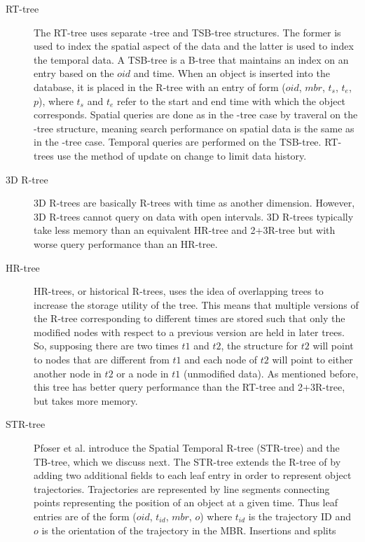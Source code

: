 \begin{description}
	\item[RT-tree] The RT-tree\cite{xu1990rt} uses separate \rbase-tree and 
	TSB-tree structures. The former is used 
	to index the spatial aspect of the data and the latter is used to index
	the temporal data. A TSB-tree is a B-tree that maintains an index on an 
	entry based on the $oid$ and time. When an object is inserted into the 
	database, it is placed in the R-tree with an entry of form 
	($oid$, $mbr$, $t_s$, $t_e$, $p$), where $t_s$ and $t_e$ refer to the 
	start and end time with which the object corresponds. Spatial queries 
	are done as in the \rbase-tree case by traveral on the \rbase-tree 
	structure, meaning search performance on spatial data is the same as in 
	the \rbase-tree case. Temporal queries are performed on the TSB-tree. 
	RT-trees use the method of update on change to limit data history.
	\item[3D R-tree] 3D R-trees \cite{nascimento1999evaluation} are basically
	R-trees with time as another dimension. However, 3D R-trees cannot 
	query on data with open intervals. 3D R-trees typically take less
	memory than an equivalent HR-tree and 2+3R-tree but with worse query 
	performance than an HR-tree.
	\item[HR-tree] HR-trees, or historical R-trees, 
	\cite{nascimento1999evaluation} uses the idea of overlapping trees to 
	increase the storage utility of the tree. This means that multiple 
	versions of the R-tree corresponding to different times are stored such 
	that only the modified nodes with respect to a previous version are 
	held in later trees. So, supposing there are two times $t1$ and $t2$, the
	structure for $t2$ will point to nodes that are different from $t1$ and
	each node of $t2$ will point to either another node in $t2$ or a node in
	$t1$ (unmodified data). As mentioned before, this tree has better query
	performance than the RT-tree and 2+3R-tree, but takes more memory.
	\item[STR-tree] Pfoser et al. introduce the Spatial Temporal R-tree 
	(STR-tree) and the TB-tree, which we discuss next\cite{pfoser2000novel}. 
	The STR-tree extends the R-tree of \cite{guttman84} by adding two additional
	fields to each leaf entry in order to represent object trajectories. 
	Trajectories are represented by line segments connecting points representing
	the position of an object at a given time. Thus leaf entries are of the 
	form ($oid$, $t_{id}$, $mbr$, $o$) where $t_{id}$ is the trajectory ID and 
	$o$ is the orientation of the trajectory in the MBR. Insertions and splits 

\end{description}

